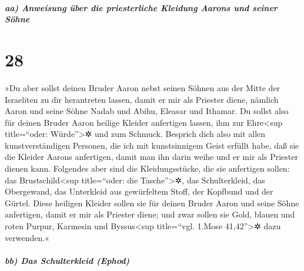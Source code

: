 \hypertarget{aa-anweisung-uxfcber-die-priesterliche-kleidung-aarons-und-seiner-suxf6hne}{%
\subparagraph{aa) Anweisung über die priesterliche Kleidung Aarons und
seiner
Söhne}\label{aa-anweisung-uxfcber-die-priesterliche-kleidung-aarons-und-seiner-suxf6hne}}

\hypertarget{section-27}{%
\section{28}\label{section-27}}

 »Du aber sollst deinen Bruder Aaron nebst seinen Söhnen
aus der Mitte der Israeliten zu dir herantreten lassen, damit er mir als
Priester diene, nämlich Aaron und seine Söhne Nadab und Abihu, Eleasar
und Ithamar.  Du sollst also für deinen Bruder Aaron
heilige Kleider anfertigen lassen, ihm zur Ehre\textless sup
title=``oder: Würde''\textgreater✲ und zum Schmuck. 
Besprich dich also mit allen kunstverständigen Personen, die ich mit
kunstsinnigem Geist erfüllt habe, daß sie die Kleider Aarons anfertigen,
damit man ihn darin weihe und er mir als Priester dienen kann.
 Folgendes aber sind die Kleidungsstücke, die sie
anfertigen sollen: das Brustschild\textless sup title=``oder: die
Tasche''\textgreater✲, das Schulterkleid, das Obergewand, das Unterkleid
aus gewürfeltem Stoff, der Kopfbund und der Gürtel. Diese heiligen
Kleider sollen sie für deinen Bruder Aaron und seine Söhne anfertigen,
damit er mir als Priester diene;  und zwar sollen sie
Gold, blauen und roten Purpur, Karmesin und Byssus\textless sup
title=``vgl. 1.Mose 41,42''\textgreater✲ dazu verwenden.«

\hypertarget{bb-das-schulterkleid-ephod}{%
\subparagraph{bb) Das Schulterkleid
(Ephod)}\label{bb-das-schulterkleid-ephod}}


